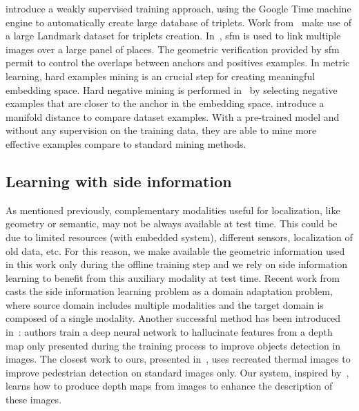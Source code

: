 \citet{Arandjelovic2017} introduce a weakly supervised training approach, using the Google Time machine engine to automatically create large database of triplets. Work from~\citep{Gordo2017,Noh2017} make use of a large Landmark dataset for triplets creation. In~\citep{Radenovic2016,Radenovic2017}, \ac{sfm} is used to link multiple images over a large panel of places. The geometric verification provided by \ac{sfm} permit to control the overlaps between anchors and positives examples. In metric learning, hard examples mining is an crucial step for creating meaningful embedding space. Hard negative mining is performed in~\citep{Arandjelovic2017,Radenovic2017,Gordo2016} by selecting negative examples that are closer to the anchor in the embedding space. \citet{Iscen2018} introduce a manifold distance to compare dataset examples. With a pre-trained model and without any supervision on the training data, they are able to mine more effective examples compare to standard mining methods.

\subsection{Learning with side information}
As mentioned previously, complementary modalities useful for localization, like geometry or semantic, may not be always available at test time. This could be due to limited resources (\eg with embedded system), different sensors, localization of old data, etc. For this reason, we make available the geometric information used in this work only during the offline training step and we rely on side information learning to benefit from this auxiliary modality at test time. Recent work from~\cite{Li2017b} casts the side information learning problem as a domain adaptation problem, where source domain includes multiple modalities and the target domain is composed of a single modality. Another successful method has been introduced in~\cite{Hoffman2016}: authors train a deep neural network to hallucinate features from a depth map only presented during the training process to improve objects detection in images. The closest work to ours, presented in~\citep{Xu2017b}, uses recreated thermal images to improve pedestrian detection on standard images only. Our system, inspired by~\citep{Xu2017b}, learns how to produce depth maps from images to enhance the description of these images.

